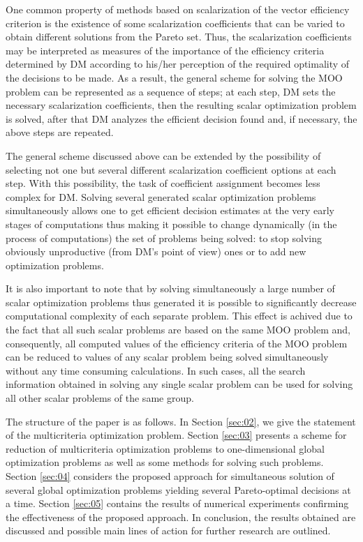 \documentclass[runningheads]{llncs}
\begin{document}
One common property of methods based on scalarization of the vector efficiency criterion is the existence of some scalarization coefficients that can be varied to obtain different solutions from the Pareto set. Thus, the scalarization coefficients may be interpreted as measures of the importance of the efficiency criteria determined by DM according to his/her perception of the required optimality of the decisions to be made. As a result, the general scheme for solving the MOO problem can be represented as a sequence of steps; at each step, DM sets the necessary scalarization coefficients, then the resulting scalar optimization problem is solved, after that DM analyzes the efficient decision found and, if necessary, the above steps are repeated.

The general scheme discussed above can be extended by the possibility of selecting not one but several different scalarization coefficient options at each step. With this possibility, the task of coefficient assignment becomes less complex for DM. Solving several generated scalar optimization problems simultaneously allows one to get efficient decision estimates at the very early stages of computations thus making it possible to change dynamically (in the process of computations) the set of problems being solved: to stop solving obviously unproductive (from DM's point of view) ones or to add new optimization problems.

It is also important to note that by solving simultaneously a large number of scalar optimization problems thus generated it is possible to significantly decrease computational complexity of each separate problem. This effect is achived due to the fact that all such scalar problems  are based on the same MOO problem and, consequently, all computed values of the efficiency criteria of the MOO problem can be reduced to values of any scalar problem being solved simultaneously without any time consuming calculations. In such cases, all the search information obtained in solving any single scalar problem can be used for solving all other scalar problems of the same group. 

The structure of the paper is as follows. In Section \ref{sec:02}, we give the statement of the multicriteria optimization problem. Section \ref{sec:03} presents a scheme for reduction of multicriteria optimization problems to one-dimensional global optimization problems as well as some methods for solving such problems. Section \ref{sec:04} considers the proposed approach for simultaneous solution of several global optimization problems yielding several Pareto-optimal decisions at a time. Section \ref{sec:05} contains the results of numerical experiments confirming the effectiveness of the proposed approach. In conclusion, the results obtained are discussed and possible main lines of action for further research are outlined.
\end{document}
